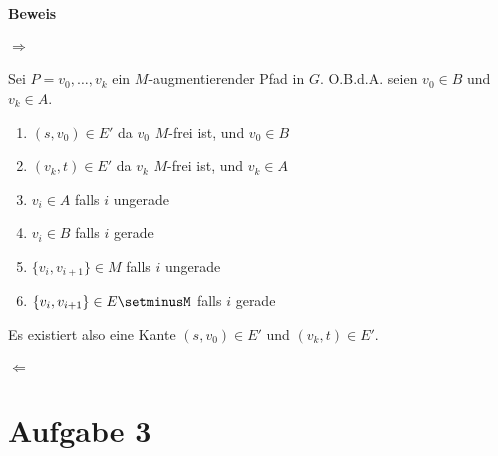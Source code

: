\documentclass[10pt,a4paper]{article}
\begin{document}
\paragraph{Beweis}

\paragraph{$\Rightarrow$}
Sei $P = v_0, \ldots, v_k$ ein $M$-augmentierender Pfad in $G$. O.B.d.A. seien $v_0 \in B$ und $v_k \in A$.
\begin{enumerate}
	\item $(s, v_0) \in E'$ da $v_0$ $M$-frei ist, und $v_0 \in B$
	\item $(v_k, t) \in E'$ da $v_k$ $M$-frei ist, und $v_k \in A$
	\item $v_i \in A$ falls $i$ ungerade
	\item $v_i \in B$ falls $i$ gerade
	\item $\{v_i, v_{i+1}\} \in M$ falls $i$ ungerade
	\item $\{v_i, v_{i+1}\} \in E\setminusM$ falls $i$ gerade
\end{enumerate}

	Es existiert also eine Kante $(s, v_0) \in E'$ und $(v_k, t) \in E'$.


\paragraph{$\Leftarrow$}


\section*{Aufgabe 3}
\end{document}
